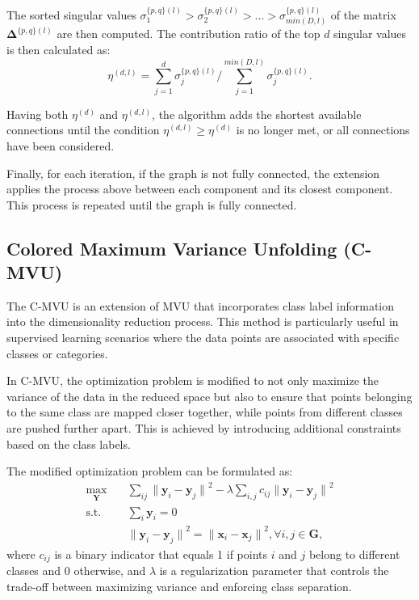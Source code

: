     The sorted singular values $\sigma_1^{\{p, q\} (l)} > \sigma_2^{\{p, q\} (l)} > ... > \sigma_{min(D,l)}^{\{p, q\} (l)}$ of the matrix $\boldsymbol{\Delta}^{\{p, q\} (l)}$ are then computed. The contribution ratio of the top $d$ singular values is then calculated as:
    \begin{equation}
        \eta^{(d, l)} = \sum_{j=1}^{d} \sigma_j^{\{p, q\} (l)} / \sum_{j=1}^{min(D,l)} \sigma_j^{\{p, q\} (l)}.
    \end{equation}

    Having both $\eta^{(d)}$ and $\eta^{(d, l)}$, the algorithm adds the shortest available connections until the condition $\eta^{(d, l)} \geq \eta^{(d)}$ is no longer met, or all connections have been considered.

    Finally, for each iteration, if the graph is not fully connected, the extension applies the process above between each component and its closest component. This process is repeated until the graph is fully connected.








    \subsection{Colored Maximum Variance Unfolding (C-MVU)}
        The \ac{C-MVU} \cite{colored-mvu} is an extension of \ac{MVU} that incorporates class label information into the dimensionality reduction process. This method is particularly useful in supervised learning scenarios where the data points are associated with specific classes or categories.

        In \ac{C-MVU}, the optimization problem is modified to not only maximize the variance of the data in the reduced space but also to ensure that points belonging to the same class are mapped closer together, while points from different classes are pushed further apart. This is achieved by introducing additional constraints based on the class labels.

        The modified optimization problem can be formulated as:
        \begin{align}
            \max_{\boldsymbol{Y}} \quad & \sum_{ij} {\| \boldsymbol{y}_i - \boldsymbol{y}_j \|}^2 - \lambda \sum_{i,j} c_{ij} {\| \boldsymbol{y}_i - \boldsymbol{y}_j \|}^2 \\
            \textrm{s.t.} \quad 
                & \sum_i \boldsymbol{y}_i = 0\\
                & {\| \boldsymbol{y}_i - \boldsymbol{y}_j \|}^2 = {\| \boldsymbol{x}_i - \boldsymbol{x}_j \|}^2, \forall{i,j} \in\boldsymbol{G},
        \end{align}
        where $c_{ij}$ is a binary indicator that equals 1 if points $i$ and $j$ belong to different classes and 0 otherwise, and $\lambda$ is a regularization parameter that controls the trade-off between maximizing variance and enforcing class separation.

